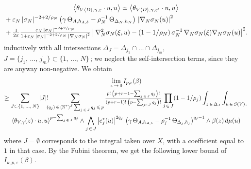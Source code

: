\documentclass[AHL,Unicode,longabstracts,published]{cedram}
\DeclarePairedDelimiter{\abs}{\lvert}{\rvert}
\newcommand*\bN{\mathbb{N}}
\let\leq\leqslant
\begin{document}
\begin{multline*}
\left\langle\theta_{V\langle D\rangle,\gamma,\varepsilon}\cdot u,u\right\rangle
\simeq\left\langle\theta_{V\langle D\rangle,\gamma,\varepsilon'}\cdot u,u\right\rangle\\
\begin{aligned}
&+\varepsilon_N\,\abs{\sigma_N}^{-2+2/\rho_N}\,
\big(\gamma\,\Theta_{A,h_{A,\delta}}-\rho_N^{-1}\,\Theta_{\Delta_N,h_N}\big)
\,\left|\nabla_N\sigma_N(u)\right|^2\\
&+\tfrac{1}{2\pi}
\tfrac{\varepsilon_N\,\abs{\sigma_N}^{-2+2/\rho_N}} { 1+\varepsilon_N\,\abs{\sigma_N}^{-2+2/\rho_N}\, \left|\nabla_N\sigma_N\right|^2}
\,\big|\,\nabla_N^2\sigma_N(\xi,u)-(1-1/\rho_N)\,
\sigma_N^{-1}\,\nabla_N\sigma_N(\xi)\nabla_N\sigma_N(u)\big|^2.
\end{aligned}
\end{multline*}
inductively with all intersections
$\Delta_J=\Delta_{j_1}\cap\ldots\cap\Delta_{j_m}$,
$J=\{j_1,\,\dotsc,\,j_m\}\subset\{1,\,\dotsc,\,N\}\,$; we neglect the self-intersection terms, since they are anyway non-negative. We obtain
\begin{multline}
\lim_{\varepsilon\,\to\,0}I_{p,\varepsilon}(\beta)\\\ge
\sum_{J\subset\{1,\,\dotsc,\,N\}}\abs{J}!\kern-5pt
\sum_{\substack{(q_j)\,\in\,(\bN^*)^J
\sum_{j\,\in\,J}q_j\,\leq\,p}}
\tfrac{p!\,\left(p+r-1-\sum_{j\,\in\,J}q_j\right)!}{(p+r-1)!\,\left(p-\sum_{j\in J}q_j\right)!}
\prod_{j\,\in\,J}(1-1/\rho_j)
\int_{z\,\in\,\Delta_J}
\int_{u\,\in\,S(V)_z}
\\
\left\langle\theta_{V,\gamma}(z)\cdot u,u\right\rangle^{p-\sum_{j\,\in\,J}q_j}\wedge
\bigwedge_{j\,\in\,J}\left|e_j^*(u)\right|^{2q_j}\,
\big(\gamma\,\Theta_{A,h_{A,\delta}}-\rho_j^{-1}\,\Theta_{\Delta_j,h_j}\big)^{q_j-1}
\wedge\beta(z)\,d\mu(u)
\end{multline}
where $J=\emptyset$ corresponds to the integral taken over $X$, with a coefficient equal to $1$ in that case. By the Fubini theorem, we get the following lower bound of $I_{k,p,\varepsilon}(\beta)$.
\end{document}
